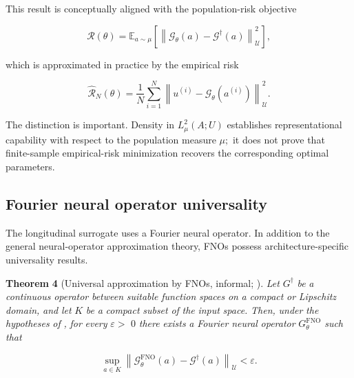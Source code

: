 This result is conceptually aligned with the population-risk objective

\begin{equation}
\label{eq:243}
\mathcal R(\theta)=\mathbb E_{a\sim\mu}\left[\left\|\mathcal G_{\theta}(a)-\mathcal G^{\dagger}(a)\right\|_{\mathcal U}^{2}\right],
\end{equation}

which is approximated in practice by the empirical risk

\begin{equation}
\label{eq:244}
\widehat{\mathcal R}_N(\theta)=\frac1N\sum_{i=1}^{N}\left\|u^{(i)}-\mathcal G_{\theta}(a^{(i)})\right\|_{\mathcal U}^{2}.
\end{equation}

The distinction is important. Density in \(L_{\mu}^{2} ( A ; U )\) establishes representational capability with respect to the population measure \(\mu ;\) it does not prove that finite-sample empirical-risk minimization recovers the corresponding optimal parameters.

\subsection{Fourier neural operator universality}
\label{sec:auxiliary_theoretical_results_fourier_neural_operator_universality}

The longitudinal surrogate uses a Fourier neural operator. In addition to the general neural-operator approximation theory, FNOs possess architecture-specific universality results.

\textbf{Theorem} \textbf{4} (Universal approximation by FNOs, informal; \cite{kovachki2023operators}). \emph{Let} \(G^{\dagger}\) \emph{be} \emph{a} \emph{continuous} \emph{operator} \emph{between} \emph{suitable} \emph{function} \emph{spaces} \emph{on} \emph{a} \emph{compact} \emph{or} \emph{Lipschitz} \emph{domain,} \emph{and} \emph{let} \(K\) \emph{be} \emph{a} \emph{compact} \emph{subset} \emph{of} \emph{the} \emph{input} \emph{space.} \emph{Then,} \emph{under} \emph{the} \emph{hypotheses} \emph{of} \emph{\cite{kovachki2023operators},} \emph{for} \emph{every} \(\varepsilon >\) 0 \emph{there} \emph{exists} \emph{a} \emph{Fourier} \emph{neural} \emph{operator} \(G_{\theta}^{\mathrm{FNO}}\) \emph{such} \emph{that}

\begin{equation}
\label{eq:245}
\sup_{a\in K}\left\|\mathcal G_{\theta}^{\mathrm{FNO}}(a)-\mathcal G^{\dagger}(a)\right\|_{\mathcal U}<\varepsilon.
\end{equation}

